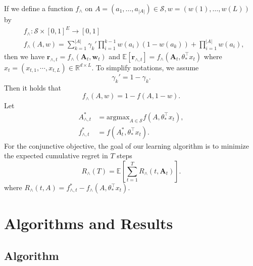 \documentclass{article}
\newcommand{\EE}{\mathbb{E}}
\newcommand{\RR}{\mathbb{R}}
\newcommand{\bA}{\mathbf{A}}
\newcommand{\br}{\mathbf{r}}
\newcommand{\bw}{\mathbf{w}}
\newcommand{\cS}{\mathcal{S}}
\newcommand{\argmax}{\mathrm{argmax}}
\newcommand{\abs}[1]{\left| #1 \right|}
\begin{document}
If we define a function $f_{\wedge}$ on $A = (a_1, \ldots, a_{\abs{A}}) \in \cS, w = (w(1), \ldots, w(L))$ by
\begin{align}
  &f_{\wedge} : \cS \times [0,1]^E \to [0,1] \nonumber \\
  &f_{\wedge}(A,w) = \sum_{k = 1}^{\abs{A}} \gamma_k' \prod_{i = 1}^{k - 1} w(a_i)(1 - w(a_k)) + \prod_{i=1}^{\abs{A}}w(a_i),
  \label{eq:functionfstar}
\end{align}
then we have $\br_{\wedge, t} = f_{\wedge}(\bA_t, \bw_t)$ and $\EE[\br_{\wedge, t}] = f_{\wedge}(\bA_t, \theta_{\ast}^{\top}x_t)$ where $x_t = (x_{t,1}, \cdots, x_{t,L}) \in \RR^{d \times L}$. To simplify notations, we assume 
$$
  \gamma_k' = 1 - \gamma_k.
$$
Then it holds that
\begin{equation} %
  \label{eq:ConDisRelation}
  f_{\wedge}(A, w) = 1 - f(A, 1 - w).
\end{equation}
Let 
\begin{align*}
  A_{\wedge, t}^{\ast} &= \argmax_{A\in \cS} f(A,\theta_{\ast}^{\top}x_t),\\
  f_{\wedge, t}^{\ast} &= f(A_t^{\ast}, \theta_{\ast}^{\top}x_t).
\end{align*}
For the conjunctive objective, the goal of our learning algorithm is to minimize the expected cumulative regret in $T$ steps
$$
  R_{\wedge}(T) = \EE\left[\sum_{t=1}^T R_{\wedge}(t, \bA_t)\right].
$$
where $R_{\wedge}(t, A) = f_{\wedge, t}^{\ast} - f_{\wedge}(A, \theta_{\ast}^{\top}x_t)$.



\section{Algorithms and Results}

\subsection{Algorithm}
	
\end{document}
